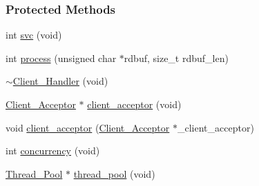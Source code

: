 \subsubsection*{Protected Methods}
\begin{CompactItemize}
\item 
int \hyperlink{classClient__Handler_Client__Handlerb0}{svc} (void)
\item 
int \hyperlink{classClient__Handler_Client__Handlerb1}{process} (unsigned char $\ast$rdbuf, size\_\-t rdbuf\_\-len)
\item 
\hyperlink{classClient__Handler_Client__Handlerb2}{$\sim$Client\_\-Handler} (void)
\item 
\hyperlink{classClient__Acceptor}{Client\_\-Acceptor} $\ast$ \hyperlink{classClient__Handler_Client__Handlerb3}{client\_\-acceptor} (void)
\item 
void \hyperlink{classClient__Handler_Client__Handlerb4}{client\_\-acceptor} (\hyperlink{classClient__Acceptor}{Client\_\-Acceptor} $\ast$\_\-client\_\-acceptor)
\item 
int \hyperlink{classClient__Handler_Client__Handlerb5}{concurrency} (void)
\item 
\hyperlink{classThread__Pool}{Thread\_\-Pool} $\ast$ \hyperlink{classClient__Handler_Client__Handlerb6}{thread\_\-pool} (void)
\end{CompactItemize}
